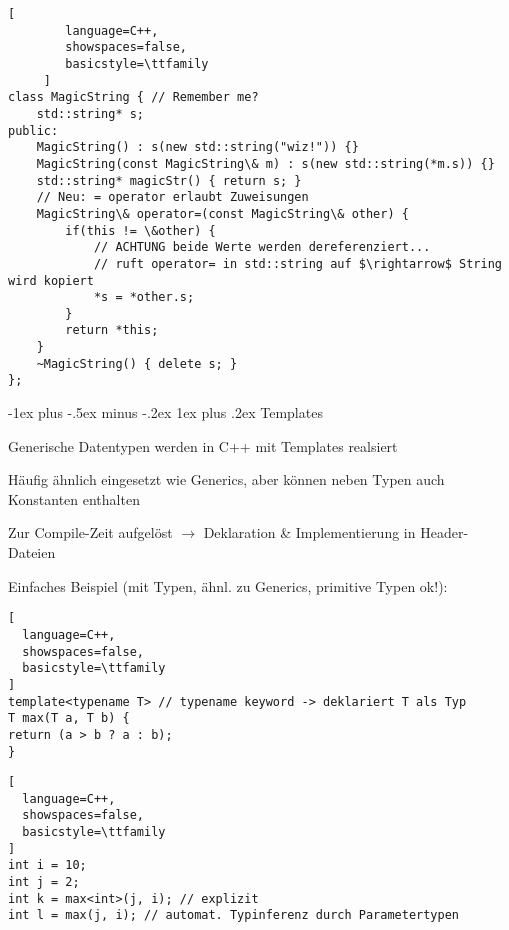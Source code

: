 \documentclass[10pt]{article}
\makeatletter
\renewcommand{\subsubsection}{\@startsection{subsubsection}{3}{0mm}%
                                {-1ex plus -.5ex minus -.2ex}%
                                {1ex plus .2ex}%
                                {\normalfont\small\bfseries}}
\makeatother
\begin{document}
\begin{itemize*}
\begin{lstlisting}[
        language=C++,
        showspaces=false,
        basicstyle=\ttfamily
     ]
class MagicString { // Remember me?
    std::string* s;
public:
    MagicString() : s(new std::string("wiz!")) {}
    MagicString(const MagicString\& m) : s(new std::string(*m.s)) {}
    std::string* magicStr() { return s; }
    // Neu: = operator erlaubt Zuweisungen
    MagicString\& operator=(const MagicString\& other) {
        if(this != \&other) {
            // ACHTUNG beide Werte werden dereferenziert...
            // ruft operator= in std::string auf $\rightarrow$ String wird kopiert
            *s = *other.s;
        }
        return *this;
    }
    ~MagicString() { delete s; }
};
\end{lstlisting}


\subsubsection{Templates}
\begin{itemize*}
  \item Generische Datentypen werden in C++ mit Templates realsiert
  \item Häufig ähnlich eingesetzt wie Generics, aber können neben Typen auch Konstanten enthalten
  \item Zur Compile-Zeit aufgelöst $\rightarrow$ Deklaration \& Implementierung in Header-Dateien
  \item Einfaches Beispiel (mit Typen, ähnl. zu Generics, primitive Typen ok!):
\end{itemize*}

\begin{lstlisting}[
  language=C++,
  showspaces=false,
  basicstyle=\ttfamily
]
template<typename T> // typename keyword -> deklariert T als Typ
T max(T a, T b) {
return (a > b ? a : b);
}
\end{lstlisting}

\begin{lstlisting}[
  language=C++,
  showspaces=false,
  basicstyle=\ttfamily
]
int i = 10;
int j = 2;
int k = max<int>(j, i); // explizit
int l = max(j, i); // automat. Typinferenz durch Parametertypen
\end{lstlisting}


\end{itemize*}
\end{document}
